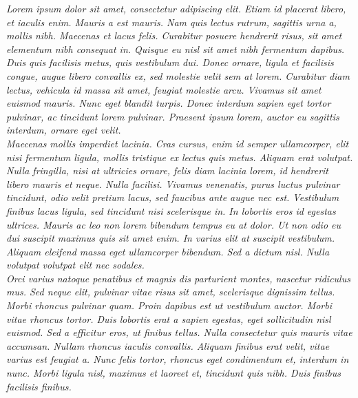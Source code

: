 \textit{
Lorem ipsum dolor sit amet, consectetur adipiscing elit. Etiam id placerat libero, et iaculis enim. Mauris a est mauris. Nam quis lectus rutrum, sagittis urna a, mollis nibh. Maecenas et lacus felis. Curabitur posuere hendrerit risus, sit amet elementum nibh consequat in. Quisque eu nisl sit amet nibh fermentum dapibus. Duis quis facilisis metus, quis vestibulum dui. Donec ornare, ligula et facilisis congue, augue libero convallis ex, sed molestie velit sem at lorem. Curabitur diam lectus, vehicula id massa sit amet, feugiat molestie arcu. Vivamus sit amet euismod mauris. Nunc eget blandit turpis. Donec interdum sapien eget tortor pulvinar, ac tincidunt lorem pulvinar. Praesent ipsum lorem, auctor eu sagittis interdum, ornare eget velit.
\\
Maecenas mollis imperdiet lacinia. Cras cursus, enim id semper ullamcorper, elit nisi fermentum ligula, mollis tristique ex lectus quis metus. Aliquam erat volutpat. Nulla fringilla, nisi at ultricies ornare, felis diam lacinia lorem, id hendrerit libero mauris et neque. Nulla facilisi. Vivamus venenatis, purus luctus pulvinar tincidunt, odio velit pretium lacus, sed faucibus ante augue nec est. Vestibulum finibus lacus ligula, sed tincidunt nisi scelerisque in. In lobortis eros id egestas ultrices. Mauris ac leo non lorem bibendum tempus eu at dolor. Ut non odio eu dui suscipit maximus quis sit amet enim. In varius elit at suscipit vestibulum. Aliquam eleifend massa eget ullamcorper bibendum. Sed a dictum nisl. Nulla volutpat volutpat elit nec sodales.
\\
Orci varius natoque penatibus et magnis dis parturient montes, nascetur ridiculus mus. Sed neque elit, pulvinar vitae risus sit amet, scelerisque dignissim tellus. Morbi rhoncus pulvinar quam. Proin dapibus est ut vestibulum auctor. Morbi vitae rhoncus tortor. Duis lobortis erat a sapien egestas, eget sollicitudin nisl euismod. Sed a efficitur eros, ut finibus tellus. Nulla consectetur quis mauris vitae accumsan. Nullam rhoncus iaculis convallis. Aliquam finibus erat velit, vitae varius est feugiat a. Nunc felis tortor, rhoncus eget condimentum et, interdum in nunc. Morbi ligula nisl, maximus et laoreet et, tincidunt quis nibh. Duis finibus facilisis finibus.}